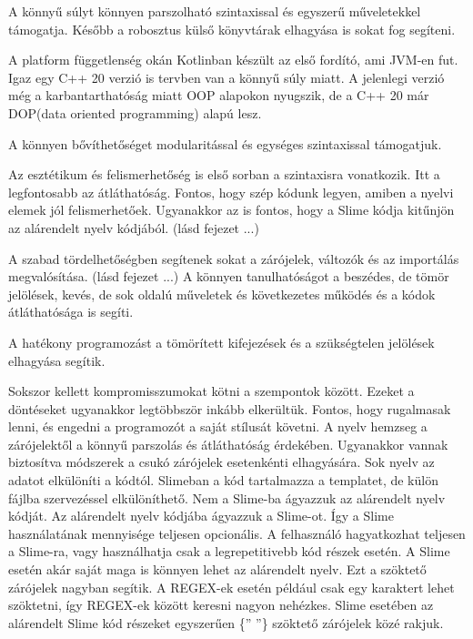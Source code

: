 A könnyű súlyt könnyen parszolható szintaxissal és egyszerű műveletekkel támogatja. 
Később a robosztus külső könyvtárak elhagyása is sokat fog segíteni.

A platform függetlenség okán Kotlinban készült az első fordító, ami JVM-en fut. 
Igaz egy C++ 20 verzió is tervben van a könnyű súly miatt. 
A jelenlegi verzió még a karbantarthatóság miatt OOP alapokon nyugszik, de a C++ 20 már DOP(data oriented programming) alapú lesz.

A könnyen bővíthetőséget modularitással és egységes szintaxissal támogatjuk.

Az esztétikum és felismerhetőség is első sorban a szintaxisra vonatkozik. 
Itt a legfontosabb az átláthatóság. 
Fontos, hogy szép kódunk legyen, amiben a nyelvi elemek jól felismerhetőek.
Ugyanakkor az is fontos, hogy a Slime kódja kitűnjön az alárendelt nyelv kódjából. (lásd fejezet ...)

A szabad tördelhetőségben segítenek sokat a zárójelek, változók és az importálás megvalósítása. (lásd fejezet ...) 
A könnyen tanulhatóságot a beszédes, de tömör jelölések, kevés, de sok oldalú műveletek és következetes működés és a kódok átláthatósága is segíti.

A hatékony programozást a tömörített kifejezések és a szükségtelen jelölések elhagyása segítik.

Sokszor kellett kompromisszumokat kötni a szempontok között. 
Ezeket a döntéseket ugyanakkor legtöbbször inkább elkerültük. 
Fontos, hogy rugalmasak lenni, és engedni a programozót a saját stílusát követni. 
A nyelv hemzseg a zárójelektől a könnyű parszolás és átláthatóság érdekében.
Ugyanakkor vannak biztosítva módszerek a csukó zárójelek esetenkénti elhagyására.
Sok nyelv az adatot elkülöníti a kódtól. 
Slimeban a kód tartalmazza a templatet, de külön fájlba szervezéssel elkülöníthető. 
Nem a Slime-ba ágyazzuk az alárendelt nyelv kódját. 
Az alárendelt nyelv kódjába ágyazzuk a Slime-ot. 
Így a Slime használatának mennyisége teljesen opcionális. 
A felhasználó hagyatkozhat teljesen a Slime-ra, vagy használhatja csak a legrepetitivebb kód részek esetén. 
A Slime esetén akár saját maga is könnyen lehet az alárendelt nyelv. 
Ezt a szöktető zárójelek nagyban segítik. 
A REGEX-ek esetén például csak egy karaktert lehet szöktetni, így REGEX-ek között keresni nagyon nehézkes. 
Slime esetében az alárendelt Slime kód részeket egyszerűen \{” ”\} szöktető zárójelek közé rakjuk.


